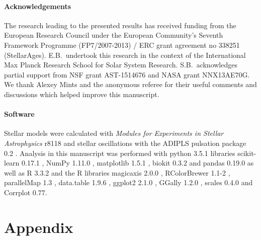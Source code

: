 %
%
%
%
\paragraph*{Acknowledgements}
\noindent The research leading to the presented results has received funding from the European Research Council under the European Community's Seventh Framework Programme (FP7/2007-2013) / ERC grant agreement no 338251 (StellarAges). E.B.\ undertook this research in the context of the International Max Planck Research School for Solar System Research. S.B.\ acknowledges partial support from NSF grant AST-1514676 and NASA grant NNX13AE70G. We thank Alexey Mints and the anonymous referee for their useful comments and discussions which helped improve this manuscript. 


%
\paragraph*{Software} 
\noindent Stellar models were calculated with  \emph{Modules for Experiments in Stellar Astrophysics} r8118 \citep[MESA,][]{2011apjs..192....3p} and stellar oscillations with the ADIPLS pulsation package 0.2 \citep{2008Ap&SS.316..113C}. 
Analysis in this manuscript was performed with python 3.5.1 libraries scikit-learn 0.17.1 \citep{scikit-learn}, NumPy 1.11.0 \citep{van2011numpy}, matplotlib 1.5.1  \citep{Hunter:2007}, biokit 0.3.2 \citep{biokit} and pandas 0.19.0 \citep{mckinney2010data} as well as R 3.3.2 \citep{R} and the R libraries magicaxis 2.0.0 \citep{magicaxis}, RColorBrewer 1.1-2 \citep{RColorBrewer}, parallelMap 1.3 \citep{parallelMap}, data.table 1.9.6 \citep{data.table}, ggplot2 2.1.0 \citep{ggplot2}, GGally 1.2.0 \citep{GGally}, scales 0.4.0 \citep{scales} and  Corrplot 0.77. 

%
%









\section{Appendix}


